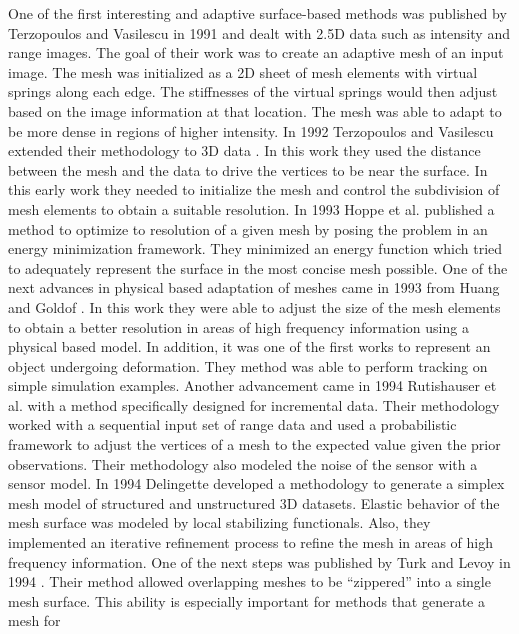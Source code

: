 One of the first interesting and adaptive surface-based methods was
published by Terzopoulos and Vasilescu in 1991 \cite{Terzopoulos1991a} and
dealt with 2.5D data such as intensity and range images. The goal of their
work was to create an adaptive mesh of an input image. The mesh was
initialized as a 2D sheet of mesh elements with virtual springs along each
edge. The stiffnesses of the virtual springs would then adjust based on the
image information at that location. The mesh was able to adapt to be more
dense in regions of higher intensity. In 1992 Terzopoulos and Vasilescu
extended their methodology to 3D data \cite{Vasilescu1992}. In this work
they used the distance between the mesh and the data to drive the vertices
to be near the surface. In this early work they needed to initialize the
mesh and control the subdivision of mesh elements to obtain a suitable
resolution. In 1993 Hoppe et al. \cite{Hoppe:1993:MO:166117.166119}
published a method to optimize to resolution of a given mesh by posing the
problem in an energy minimization framework. They minimized an energy
function which tried to adequately represent the surface in the most
concise mesh possible. One of the next advances in physical based
adaptation of meshes came in 1993 from Huang and Goldof \cite{Huang1993}.
In this work they were able to adjust the size of the mesh elements to
obtain a better resolution in areas of high frequency information using a
physical based model. In addition, it was one of the first works to
represent an object undergoing deformation. They method was able to perform
tracking on simple simulation examples. Another advancement came in 1994
Rutishauser et al. \cite{Rutishauser1994} with a method specifically
designed for incremental data. Their methodology worked with a sequential
input set of range data and used a probabilistic framework to adjust the
vertices of a mesh to the expected value given the prior observations.
Their methodology also modeled the noise of the sensor with a sensor model.
In 1994 Delingette \cite{Delingette1994} developed a methodology to
generate a simplex mesh model of structured and unstructured 3D datasets.
Elastic behavior of the mesh surface was modeled by local stabilizing
functionals. Also, they implemented an iterative refinement process to
refine the mesh in areas of high frequency information. One of the next
steps was published by Turk and Levoy in 1994 \cite{Turk1994}. Their method
allowed overlapping meshes to be ``zippered'' into a single mesh surface.
This ability is especially important for methods that generate a mesh for
